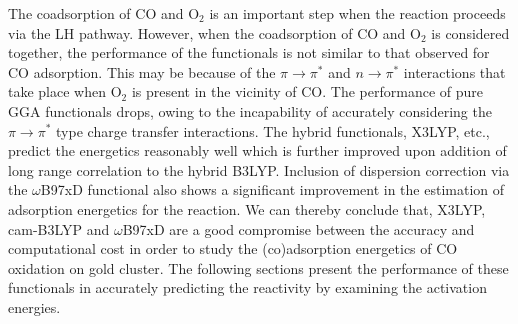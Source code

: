 The coadsorption of CO and O$_2$ is an important step when the reaction proceeds via the LH pathway. However, when the coadsorption of CO and O$_2$ is considered together, the performance of the functionals is not similar to that observed for CO adsorption. This may be because of the $\pi \rightarrow \pi^*$ and $n \rightarrow \pi^*$ interactions that take place when O$_2$ is present in the vicinity of CO. The performance of pure GGA functionals drops, owing to the incapability of accurately considering the $\pi \rightarrow \pi^*$ type charge transfer interactions. The hybrid functionals, X3LYP, etc., predict the energetics reasonably well which is further improved upon addition of long range correlation to the hybrid B3LYP. Inclusion of dispersion correction via the $\omega$B97xD functional also shows a significant improvement in the estimation of adsorption energetics for the reaction. We can thereby conclude that, X3LYP, cam-B3LYP and $\omega$B97xD are a good compromise between the accuracy and computational cost in order to study the (co)adsorption energetics of CO oxidation on gold cluster. The following sections present the performance of these functionals in accurately predicting the reactivity by examining the activation energies.

